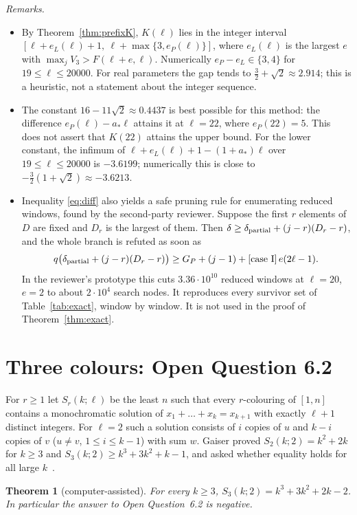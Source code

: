 \documentclass[11pt]{amsart}
\newtheorem{theorem}{Theorem}
\theoremstyle{definition}
\newcommand{\F}{F}
\begin{document}
\noindent\emph{Remarks.}
\begin{itemize}
\item By Theorem~\ref{thm:prefixK}, $K(\ell)$ lies in the integer interval $[\ell+e_L(\ell)+1,\ \ell+\max\{3,e_P(\ell)\}]$, where $e_L(\ell)$ is the largest $e$ with $\max_jV_3>\F(\ell+e,\ell)$. Numerically $e_P-e_L\in\{3,4\}$ for $19\le\ell\le20000$. For real parameters the gap tends to $\frac32+\sqrt2\approx2.914$; this is a heuristic, not a statement about the integer sequence.
\item The constant $16-11\sqrt2\approx0.4437$ is best possible for this method: the difference $e_P(\ell)-a_*\ell$ attains it at $\ell=22$, where $e_P(22)=5$. This does not assert that $K(22)$ attains the upper bound. For the lower constant, the infimum of $\ell+e_L(\ell)+1-(1+a_*)\ell$ over $19\le\ell\le20000$ is $-3.6199$; numerically this is close to $-\frac32(1+\sqrt2)\approx-3.6213$.
\item Inequality \eqref{eq:diff} also yields a safe pruning rule for enumerating reduced windows, found by the second-party reviewer. Suppose the first $r$ elements of $D$ are fixed and $D_r$ is the largest of them. Then $\delta\ge\delta_{\rm partial}+(j-r)(D_r-r)$, and the whole branch is refuted as soon as
\[
q\bigl(\delta_{\rm partial}+(j-r)(D_r-r)\bigr)\ge G_P+(j-1)+[\text{case I}]\,e(2\ell-1).
\]
In the reviewer's prototype this cuts $3.36\cdot10^{10}$ reduced windows at $\ell=20$, $e=2$ to about $2\cdot10^4$ search nodes. It reproduces every survivor set of Table~\ref{tab:exact}, window by window. It is not used in the proof of Theorem~\ref{thm:exact}.
\end{itemize}


\section{Three colours: Open Question 6.2}\label{sec:oq62}

For $r\ge1$ let $S_r(k;\ell)$ be the least $n$ such that every $r$-colouring of $[1,n]$ contains a monochromatic solution of $x_1+\dots+x_k=x_{k+1}$ with exactly $\ell+1$ distinct integers. For $\ell=2$ such a solution consists of $i$ copies of $u$ and $k-i$ copies of $v$ ($u\ne v$, $1\le i\le k-1$) with sum $w$. Gaiser proved $S_2(k;2)=k^2+2k$ for $k\ge3$ and $S_3(k;2)\ge k^3+3k^2+k-1$, and asked whether equality holds for all large $k$~\cite[Open Question~6.2]{Gaiser}.

\begin{theorem}[computer-assisted]\label{thm:oq62}
For every $k\ge3$, $S_3(k;2)=k^3+3k^2+2k-2$. In particular the answer to Open Question~6.2 is negative.
\end{theorem}
\end{document}
